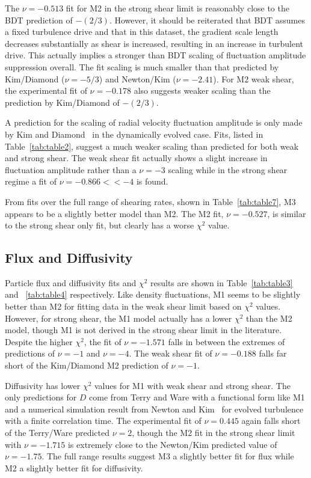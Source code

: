 \documentclass[aip,pop,amsmath,amssymb,preprint,superscriptaddress]{revtex4-1} %
\begin{document}
The $\nu = -0.513$ fit for M2 in the strong shear limit is reasonably close to the BDT prediction of $-(2/3)$. However, it should be reiterated that BDT assumes a fixed turbulence drive and that in this dataset, the gradient scale length decreases substantially as shear is increased, resulting in an increase in turbulent drive.  This actually implies a stronger than BDT scaling of fluctuation amplitude suppression overall. The fit scaling is much smaller than that predicted by Kim/Diamond ($\nu = -5/3$) and Newton/Kim ($\nu = -2.41$). For M2 weak shear, the experimental fit of $\nu = -0.178$ also suggests weaker scaling than the prediction by Kim/Diamond of $-(2/3)$.

A prediction for the scaling of radial velocity fluctuation amplitude is only made by Kim and Diamond~\cite{kim04} in the dynamically evolved case. Fits, listed in Table~\ref{tab:table2}, suggest a much weaker scaling than predicted for both weak and strong shear. The weak shear fit actually shows a slight increase in fluctuation amplitude rather than a $\nu = -3$ scaling while in the strong shear regime a fit of $\nu = -0.866 << -4$ is found.

From fits over the full range of shearing rates, shown in Table~\ref{tab:table7}, M3 appears to be a slightly better model than M2. The M2 fit, $\nu = -0.527$, is similar to the strong shear only fit, but clearly has a worse $\chi^{2}$ value.

\subsection{Flux and Diffusivity}

Particle flux and diffusivity fits and $\chi^{2}$ results are shown in Table~\ref{tab:table3} and ~\ref{tab:table4} respectively. Like density fluctuations, M1 seems to be slightly better than M2 for fitting data in the weak shear limit based on $\chi^{2}$ values.  However, for strong shear, the M1 model actually has a lower $\chi^{2}$ than the M2 model, though M1 is not derived in the strong shear limit in the literature. Despite the higher $\chi^{2}$, the fit of $\nu = -1.571$ falls in between the extremes of predictions of $\nu = -1$ and $\nu = -4$. The weak shear fit of $\nu = -0.188$ falls far short of the Kim/Diamond M2 prediction of $\nu = -1$.

Diffusivity has lower $\chi^{2}$ values for M1 with weak shear and strong shear. The only predictions for $D$ come from Terry and Ware with a functional form like M1 and a numerical simulation result from Newton and Kim~\cite{newton11} for evolved turbulence with a finite correlation time. The experimental fit of $\nu = 0.445$ again falls short of the Terry/Ware predicted $\nu = 2$, though the M2 fit in the strong shear limit with $\nu = -1.715$ is extremely close to the Newton/Kim predicted value of $\nu = -1.75$. The full range results suggest M3 a slightly better fit for flux while M2 a slightly better fit for diffusivity.
\end{document}
